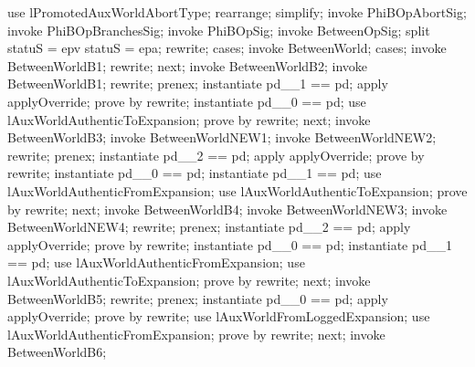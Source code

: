 \pagebreak
\begin{LPScript}\begin{zproof}[lPromotedBetweenWorldAbortType]
    use lPromotedAuxWorldAbortType;
    rearrange;
    simplify;
    invoke PhiBOpAbortSig;
    invoke PhiBOpBranchesSig;
    invoke PhiBOpSig;
    invoke BetweenOpSig;
    split statuS = epv \lor statuS = epa;
    rewrite;
    cases;
        invoke BetweenWorld;
        cases;
            invoke BetweenWorldB1;
            rewrite;
        next;
            invoke BetweenWorldB2;
            invoke BetweenWorldB1;
            rewrite;
            prenex;
            instantiate pd\_\_1 == pd;
            apply applyOverride;
            prove by rewrite;
            instantiate pd\_\_0 == pd;
            use lAuxWorldAuthenticToExpansion;
            prove by rewrite;
        next;
            invoke BetweenWorldB3;
            invoke BetweenWorldNEW1;
            invoke BetweenWorldNEW2;
            rewrite;
            prenex;
            instantiate pd\_\_2 == pd;
            apply applyOverride;
            prove by rewrite;
            instantiate pd\_\_0 == pd;
            instantiate pd\_\_1 == pd;
            use lAuxWorldAuthenticFromExpansion;
            use lAuxWorldAuthenticToExpansion;
            prove by rewrite;
        next;
            invoke BetweenWorldB4;
            invoke BetweenWorldNEW3;
            invoke BetweenWorldNEW4;
            rewrite;
            prenex;
            instantiate pd\_\_2 == pd;
            apply applyOverride;
            prove by rewrite;
            instantiate pd\_\_0 == pd;
            instantiate pd\_\_1 == pd;
            use lAuxWorldAuthenticFromExpansion;
            use lAuxWorldAuthenticToExpansion;
            prove by rewrite;
        next;
            invoke BetweenWorldB5;
            rewrite;
            prenex;
            instantiate pd\_\_0 == pd;
            apply applyOverride;
            prove by rewrite;
            use lAuxWorldFromLoggedExpansion;
            use lAuxWorldAuthenticFromExpansion;
            prove by rewrite;
        next;
            invoke BetweenWorldB6;

\end{zproof}
\end{LPScript}
